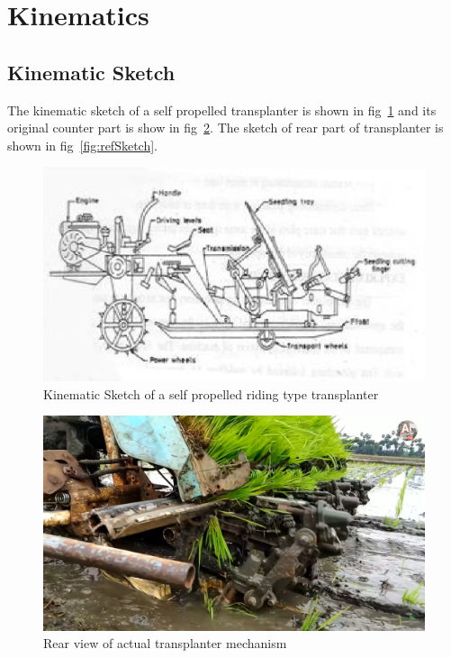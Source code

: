 \documentclass[a4paper,latin,center,onecolumn]{paper}
\begin{document}
    \section{Kinematics}
        \subsection{Kinematic Sketch}

        The kinematic sketch of a self propelled transplanter is shown in fig~\ref{fig:kineSketch} and its original counter part is show in fig~\ref{fig:originalMechanism}. The sketch of rear part of transplanter is shown in fig~\ref{fig:refSketch}.

        \begin{figure}[hbt!]
            \centering
            \includegraphics[width=0.9\columnwidth]{Images/Kinematic_sketch_self_propelled_transplanter.png}
            \caption{Kinematic Sketch of a self propelled riding type transplanter}
            \label{fig:kineSketch}
        \end{figure}

        \begin{figure}[hbt!]
            \centering
            \includegraphics[width=0.9\columnwidth]{Images/Original_transplanter.png}
            \caption{Rear view of actual transplanter mechanism}
            \label{fig:originalMechanism}
        \end{figure}
        
\end{document}
